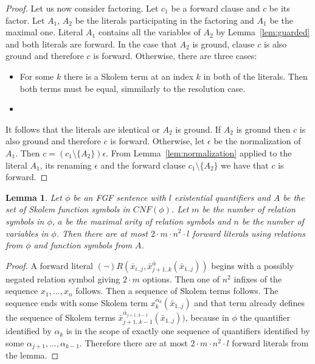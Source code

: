 \documentclass[english, shortabstract]{iithesis}
\theoremstyle{definition} \newtheorem{definition}{Definition}[chapter]
\theoremstyle{remark} \newtheorem{remark}[definition]{Observation}
\theoremstyle{plain} \newtheorem{theorem}[definition]{Theorem}
\theoremstyle{plain} \newtheorem{lemma}[definition]{Lemma}
\begin{document}
\begin{proof}
\par Let us now consider factoring. Let $c_1$ be a forward clause and $c$ be its factor.
Let $A_1$, $A_2$ be the literals participating in the factoring and $A_1$ be the maximal one.
Literal $A_1$ contains all the variables of $A_2$ by Lemma~\ref{lem:guarded} and both literals are forward. 
In the case that $A_2$ is ground, clause $c$ is also ground and therefore $c$ is forward. 
Otherwise, there are three cases:
\begin{itemize}
    \item For some $k$ there is a Skolem term at an index $k$ in both of the literals. Then both terms must be equal, simmilarly to the resolution case.
    \item 
\end{itemize}
It follows that the literals are identical or $A_2$ is ground. If $A_2$ is ground then $c$ is also ground and therefore $c$ is forward.
Otherwise, let $\epsilon$ be the normalization of $A_1$.
Then $c=(c_1\setminus\{A_2\})\epsilon$. From Lemma~\ref{lem:normalization} applied to the 
literal $A_1$, its renaming $\epsilon$ and the forward clause $c_1\setminus\{A_2\}$ we have that $c$ is forward.
\end{proof}

\begin{lemma}\label{lem:size}
Let $\phi$ be an FGF sentence with $l$ existential quantifiers and 
$A$ be the set of Skolem function symbols in $\mathit{CNF}(\phi)$.
Let $m$ be the number of relation symbols in $\phi$, $a$ be the maximal arity
of relation symbols and $n$ be the number of variables in $\phi$. 
Then there are at most $2\cdot m \cdot n^2 \cdot l$ forward literals using relations from $\phi$ and function symbols from $A$.
\end{lemma}
\begin{proof}
A forward literal $(\lnot)R(\bar{x}_{i..j}, \bar{x}^{\bar{\alpha}}_{{j+1..k}}(\bar{x}_{1..j}))$
begins with a possibly negated relation symbol giving $2\cdot m$ options. 
Then one of $n^2$ infixes of the sequence $x_1, \dots, x_n$ follows.
Then a sequence of Skolem terms follows.
The sequence ends with some Skolem term $x^{\alpha_k}_k(\bar{x}_{1..j})$ and that term 
already defines the sequence of Skolem terms $\bar{x}^{\bar{\alpha}_{j+1..k-1}}_{{j+1..k-1}}(\bar{x}_{1..j}))$,
because in $\phi$ the quantifier identified by $\alpha_k$ is in the scope of exactly one sequence of quantifiers identified by some $\alpha_{j+1},\dots, \alpha_{k-1}$.
Therefore there are at most $2\cdot m \cdot n^2 \cdot l$ forward literals from the lemma.
\end{proof}
\end{document}
